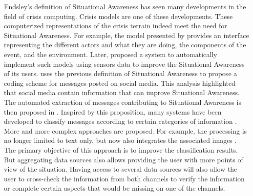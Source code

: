 Endsley's definition of Situational Awareness has seen many developments in the field of crisis computing.
Crisis models are one of these developments.
These computerized representations of the crisis terrain indeed meet the need for Situational Awareness.
For example, the model presented by \textcite{benabenMetamodelItsOntology2008} provides an interface representing the different actors and what they are doing, the components of the event, and the environment.
Later, \textcite{fertierRealtimeDataExploitation2020} proposed a system to automatically implement such models using sensors data to improve the Situational Awareness of its users.
\textcite{viewegSituationalAwarenessMass2012} uses the previous definition of Situational Awareness to propose a coding scheme for messages posted on social media.
This analysis highlighted that social media contain information that can improve Situational Awareness.
The automated extraction of messages contributing to Situational Awareness is then proposed in \textcite{vermaNaturalLanguageProcessing2011}.
Inspired by this proposition, many systems have been developed to classify messages according to certain categories of information \parencite{carageaClassifyingTextMessages2011, imranAIDRArtificialIntelligence2014,ashktorabTweedrMiningTwitter2014}.
More and more complex approaches are proposed.
For example, the processing is no longer limited to text only, but now also integrates the associated images \textcite{alamImage4ActOnlineSocial2017}.
The primary objective of this approach is to improve the classification results.
But aggregating data sources also allows providing the user with more points of view of the situation.
Having access to several data sources will also allow the user to cross-check the information from both channels to verify the information or complete certain aspects that would be missing on one of the channels.

